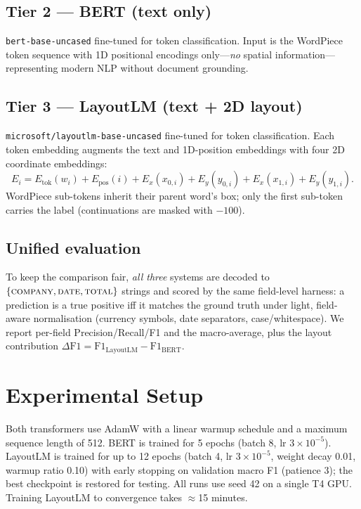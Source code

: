 \documentclass[11pt]{article}
\begin{document}
\subsection{Tier 2 --- BERT (text only)}
\texttt{bert-base-uncased} fine-tuned for token classification. Input is the
WordPiece token sequence with 1D positional encodings only---\emph{no} spatial
information---representing modern NLP without document grounding.

\subsection{Tier 3 --- LayoutLM (text + 2D layout)}
\texttt{microsoft/layoutlm-base-uncased} fine-tuned for token classification. Each
token embedding augments the text and 1D-position embeddings with four 2D
coordinate embeddings:
\begin{equation}
E_i = E_{\text{tok}}(w_i) + E_{\text{pos}}(i)
    + E_{x}(x_{0,i}) + E_{y}(y_{0,i}) + E_{x}(x_{1,i}) + E_{y}(y_{1,i}).
\end{equation}
WordPiece sub-tokens inherit their parent word's box; only the first sub-token
carries the label (continuations are masked with $-100$).

\subsection{Unified evaluation}
To keep the comparison fair, \emph{all three} systems are decoded to
$\{\textsc{company},\textsc{date},\textsc{total}\}$ strings and scored by the same
field-level harness: a prediction is a true positive iff it matches the ground
truth under light, field-aware normalisation (currency symbols, date separators,
case/whitespace). We report per-field Precision/Recall/F1 and the macro-average,
plus the layout contribution $\Delta\text{F1}=\text{F1}_{\text{LayoutLM}}-\text{F1}_{\text{BERT}}$.

\section{Experimental Setup}
Both transformers use AdamW with a linear warmup schedule and a maximum sequence
length of 512. BERT is trained for 5 epochs (batch 8, lr $3{\times}10^{-5}$).
LayoutLM is trained for up to 12 epochs (batch 4, lr $3{\times}10^{-5}$, weight
decay 0.01, warmup ratio 0.10) with early stopping on validation macro F1
(patience 3); the best checkpoint is restored for testing. All runs use seed 42
on a single T4 GPU. Training LayoutLM to convergence takes $\approx$15 minutes.
\end{document}
